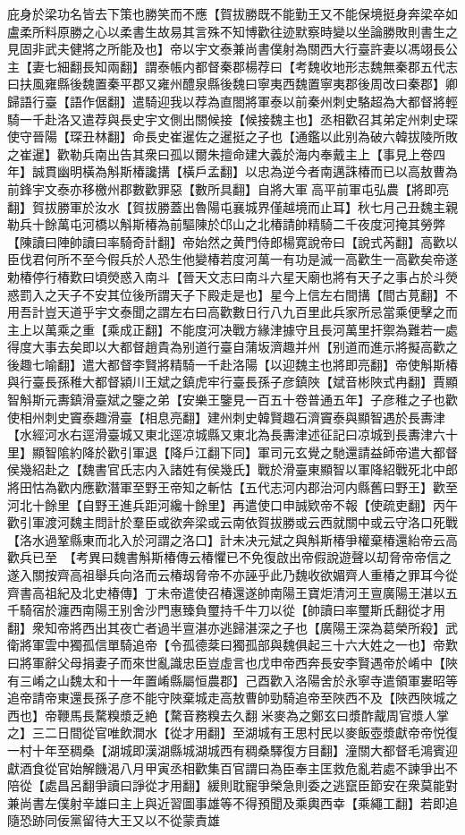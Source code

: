 庇身於梁功名皆去下策也勝笑而不應【賀拔勝既不能勤王又不能保境挺身奔梁卒如盧柔所料原勝之心以柔書生故易其言殊不知博歡往迹默察時變以坐論勝敗則書生之見固非武夫健將之所能及也】帝以宇文泰兼尚書僕射為關西大行臺許妻以馮翊長公主【妻七細翻長知兩翻】謂泰帳内都督秦郡楊荐曰【考魏收地形志魏無秦郡五代志曰扶風雍縣後魏置秦平郡又雍州醴泉縣後魏曰寧夷西魏置寧夷郡後周改曰秦郡】卿歸語行臺【語作倨翻】遣騎迎我以荐為直閤將軍泰以前秦州刺史駱超為大都督將輕騎一千赴洛又遣荐與長史宇文側出關候接【候接魏主也】丞相歡召其弟定州刺史琛使守晉陽【琛丑林翻】命長史崔暹佐之暹挺之子也【通鑑以此别為破六韓拔陵所敗之崔暹】歡勒兵南出告其衆曰孤以爾朱擅命建大義於海内奉戴主上【事見上卷四年】誠貫幽明橫為斛斯椿讒搆【橫戶孟翻】以忠為逆今者南邁誅椿而已以高敖曹為前鋒宇文泰亦移檄州郡數歡罪惡【數所具翻】自將大軍高平前軍屯弘農【將即亮翻】賀拔勝軍於汝水【賀拔勝蓋出魯陽屯襄城界僅越境而止耳】秋七月己丑魏主親勒兵十餘萬屯河橋以斛斯椿為前驅陳於邙山之北椿請帥精騎二千夜度河掩其勞弊【陳讀曰陣帥讀曰率騎奇計翻】帝始然之黄門侍郎楊寛說帝曰【說式芮翻】高歡以臣伐君何所不至今假兵於人恐生他變椿若度河萬一有功是滅一高歡生一高歡矣帝遂勅椿停行椿歎曰頃熒惑入南斗【晉天文志曰南斗六星天廟也將有天子之事占於斗熒惑罰入之天子不安其位後所謂天子下殿走是也】星今上信左右間搆【間古莧翻】不用吾計豈天道乎宇文泰聞之謂左右曰高歡數日行八九百里此兵家所忌當乘便擊之而主上以萬乘之重【乘成正翻】不能度河决戰方緣津據守且長河萬里扞禦為難若一處得度大事去矣即以大都督趙貴為别道行臺自蒲坂濟趣并州【别道而進示將擬高歡之後趣七喻翻】遣大都督李賢將精騎一千赴洛陽【以迎魏主也將即亮翻】帝使斛斯椿與行臺長孫稚大都督潁川王斌之鎮虎牢行臺長孫子彦鎮陜【斌音彬陜式冉翻】賈顯智斛斯元夀鎮滑臺斌之鑒之弟【安樂王鑒見一百五十卷普通五年】子彦稚之子也歡使相州刺史竇泰趣滑臺【相息亮翻】建州刺史韓賢趣石濟竇泰與顯智遇於長夀津【水經河水右逕滑臺城又東北逕凉城縣又東北為長夀津述征記曰凉城到長夀津六十里】顯智隂約降於歡引軍退【降戶江翻下同】軍司元玄覺之馳還請益師帝遣大都督侯幾紹赴之【魏書官氏志内入諸姓有侯幾氏】戰於滑臺東顯智以軍降紹戰死北中郎將田怙為歡内應歡潛軍至野王帝知之斬怙【五代志河内郡治河内縣舊曰野王】歡至河北十餘里【自野王進兵距河纔十餘里】再遣使口申誠欵帝不報【使疏吏翻】丙午歡引軍渡河魏主問計於羣臣或欲奔梁或云南依賀拔勝或云西就關中或云守洛口死戰【洛水過鞏縣東而北入於河謂之洛口】計未决元斌之與斛斯椿爭權棄椿還紿帝云高歡兵已至　【考異曰魏書斛斯椿傳云椿懼已不免復啟出帝假說遊聲以刧脅帝帝信之遂入關按齊高祖舉兵向洛而云椿刼脅帝不亦誣乎此乃魏收欲媚齊人重椿之罪耳今從齊書高祖紀及北史椿傳】丁未帝遣使召椿還遂帥南陽王寶炬清河王亶廣陽王湛以五千騎宿於瀍西南陽王别舍沙門惠臻負璽持千牛刀以從【帥讀曰率璽斯氏翻從才用翻】衆知帝將西出其夜亡者過半亶湛亦逃歸湛深之子也【廣陽王深為葛榮所殺】武衛將軍雲中獨孤信單騎追帝【令孤德棻曰獨孤部與魏俱起三十六大姓之一也】帝歎曰將軍辭父母捐妻子而來世亂識忠臣豈虛言也戊申帝西奔長安李賢遇帝於崤中【陜有三崤之山魏太和十一年置崤縣屬恒農郡】己酉歡入洛陽舍於永寧寺遣領軍婁昭等追帝請帝東還長孫子彦不能守陜棄城走高敖曹帥勁騎追帝至陜西不及【陜西陜城之西也】帝鞭馬長騖糗漿乏絶【騖音務糗去久翻米麥為之鄭玄曰漿酢酨周官漿人掌之】三二日間從官唯飲澗水【從才用翻】至湖城有王思村民以麥飯壺漿獻帝帝悦復一村十年至稠桑【湖城即漢湖縣城湖城西有稠桑驛復方目翻】潼關大都督毛鴻賓迎獻酒食從官始解饑渴八月甲寅丞相歡集百官謂曰為臣奉主匡救危亂若處不諫爭出不陪從【處昌呂翻爭讀曰諍從才用翻】緩則耽寵爭榮急則委之逃竄臣節安在衆莫能對兼尚書左僕射辛雄曰主上與近習圖事雄等不得預聞及乘輿西幸【乘繩工翻】若即追隨恐跡同佞黨留待大王又以不從蒙責雄
